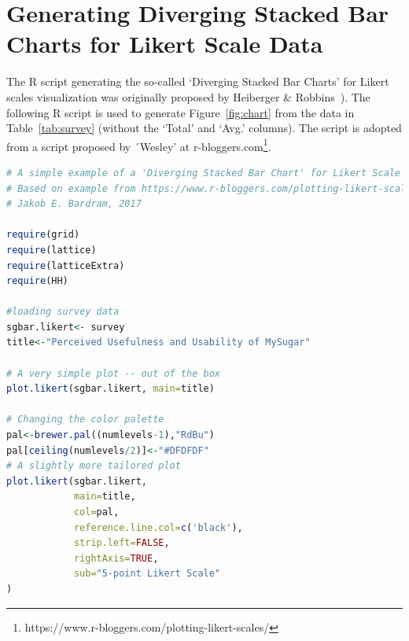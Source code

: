 \section{Generating Diverging Stacked Bar Charts for Likert Scale Data}

The R script generating the so-called `Diverging Stacked Bar Charts' for Likert scales visualization was originally proposed by Heiberger \& Robbins~\cite{heiberger2014design}). The following R script is used to generate Figure~\ref{fig:chart} from the data in Table~\ref{tab:survey} (without the `Total' and `Avg.' columns). The script is adopted from a script proposed by ´Wesley' at r-bloggers.com\footnote{https://www.r-bloggers.com/plotting-likert-scales/}.

\begin{lstlisting}[language=R]
# A simple example of a 'Diverging Stacked Bar Chart' for Likert Scale data on perceived usefulness and usability 
# Based on example from https://www.r-bloggers.com/plotting-likert-scales/
# Jakob E. Bardram, 2017

require(grid)
require(lattice)
require(latticeExtra)
require(HH)

#loading survey data
sgbar.likert<- survey
title<-"Perceived Usefulness and Usability of MySugar"

# A very simple plot -- out of the box
plot.likert(sgbar.likert, main=title)

# Changing the color palette
pal<-brewer.pal((numlevels-1),"RdBu")
pal[ceiling(numlevels/2)]<-"#DFDFDF"
# A slightly more tailored plot
plot.likert(sgbar.likert,
            main=title,
            col=pal,
            reference.line.col=c('black'),
            strip.left=FALSE,
            rightAxis=TRUE,
            sub="5-point Likert Scale"
)

\end{lstlisting}

